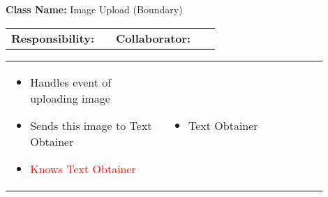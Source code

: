 \begin{cards}[]
    \textbf{Class Name:} Image Upload (Boundary)
    \tcbline
    \begin{tabular}{p{0.45\linewidth} | p{0.45\linewidth}}
        \textbf{Responsibility:}& 
        \textbf{Collaborator:}\\
    \end{tabular}
    \tcbline
    \begin{tabular}{p{0.45\linewidth} | p{0.45\linewidth}}
        \begin{itemize}
            \item Handles event of uploading image
            \item Sends this image to Text Obtainer
            \item \textcolor{red}{Knows Text Obtainer}
        \end{itemize}
        &
        \begin{itemize}
            \item Text Obtainer
        \end{itemize}
    \end{tabular}
\end{cards}